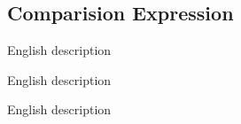 
\subsection{Comparision Expression}
{
	\lipsum[1]
	
	\begin{itemize}
	{
		\item[\texttt{code}] English description
		
		\item[\texttt{code}] English description
		
		\item[\texttt{code}] English description
	}
	\end{itemize}
}
